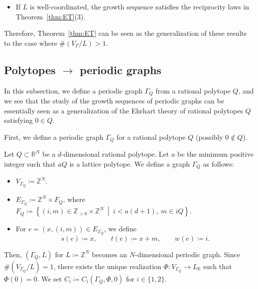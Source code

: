 \documentclass[ALCO,published]{cedram}
\theoremstyle{remark}
\begin{document}
\begin{rmk}
\begin{itemize}
\item If $L$ is well-coordinated, 
the growth sequence satisfies the reciprocity laws in Theorem~\ref{thm:ET}(3). 
\end{itemize}
Therefore, Theorem~\ref{thm:ET} can be seen as the generalization of these results to the case where $\# (V_{\Gamma} /L) > 1$. 
\end{rmk}

\subsection{Polytopes \texorpdfstring{$\to$}{to} periodic graphs}\label{subsection:PtoPG}
In this subsection, we define a periodic graph $\Gamma _Q$ from a rational polytope $Q$, and 
we see that the study of the growth sequences of periodic graphs can be essentially seen as 
a generalization of the Ehrhart theory of rational polytopes $Q$ satisfying $0 \in Q$. 

First, we define a periodic graph $\Gamma _Q$ for a rational polytope $Q$ (possibly $0 \not \in Q$). 
\begin{defi}
Let $Q \subset \mathbb{R}^N$ be a $d$-dimensional rational polytope. 
Let $a$ be the minimum positive integer such that $aQ$ is a lattice polytope. 
We define a graph $\Gamma _Q$ as follows: 
\begin{itemize}
\item 
$V_{\Gamma _Q} \coloneqq  \mathbb{Z}^N$. 

\item 
$E_{\Gamma _Q} \coloneqq  \mathbb{Z}^N \times F_Q$, 
where $F_Q \coloneqq  \left \{ (i, m) \in \mathbb{Z}_{>0} \times \mathbb{Z}^N \ \middle | \  i < a(d+1),\ m \in iQ  \right\}$. 

\item 
For $e = (x, (i,m)) \in E_{\Gamma _Q}$, we define 
\[
s(e) \coloneqq  x, \qquad t(e) \coloneqq  x+m, \qquad w(e) \coloneqq  i. 
\]
\end{itemize}
Then, $\left( \Gamma _Q, L \right)$ for $L \coloneqq  \mathbb{Z}^N$ becomes an $N$-dimensional periodic graph. 
Since $\# \left( V_{\Gamma _Q}/L \right) = 1$, there exists the unique realization $\Phi : V_{\Gamma _Q} \to L_{\mathbb{R}}$ such that $\Phi(0)=0$. We set $C_i \coloneqq  C_i(\Gamma _Q, \Phi, 0)$ for $i \in \{1, 2 \}$. 
\end{defi}
\end{document}
